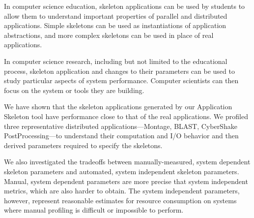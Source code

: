 \documentclass[preprint,12pt]{elsarticle}
\newcommand{\katznote}[1]{ {\textcolor{blue}    { ***Dan:   #1 }}}
\newcommand{\zhaonote}[1]{{\textcolor{darkgreen}{ ***Zhao:  #1 }}}
\newcommand{\katznote}[1]{}
\newcommand{\zhaonote}[1]{}
\begin{document}
In computer science education, skeleton applications can be used by students to allow them to understand important properties of parallel and distributed applications.  Simple skeletons can be used as instantiations of application abstractions, and more complex skeletons can be used in place of real applications.

In computer science research, including but not limited to the educational process,
skeleton application and changes to their parameters can be used to
study particular aspects of system performance.
Computer scientists can then focus on the system or tools they are building.

We have shown that the skeleton applications generated by our Application Skeleton tool have performance close to that of the real applications.  We profiled three representative distributed applications---Montage, BLAST, CyberShake PostProcessing---to understand their computation and I/O behavior and then derived parameters required to specify
the skeletons.  

We also investigated the tradeoffs between manually-measured, system dependent skeleton parameters and
automated, system independent skeleton parameters. Manual, system dependent parameters are more precise that system
independent metrics, which are also harder to obtain.  The system independent parameters, however, represent reasonable
estimates for resource consumption on systems where manual
profiling is difficult or impossible to perform.

\end{document}
